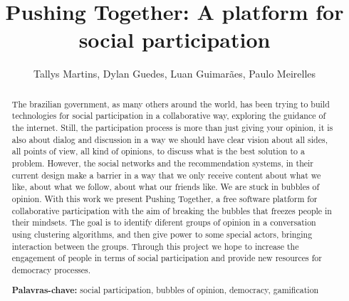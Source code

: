 \documentclass{llncs}
\begin{document}
\sloppy
\title{Pushing Together: A platform for social participation}

\author{Tallys Martins, Dylan Guedes,
        Luan Guimarães, Paulo Meirelles}


\maketitle
\begin{abstract}
  The brazilian government, as many others around the world, has been trying to
  build technologies for social participation in a collaborative way, exploring
  the guidance of the internet.
  Still, the participation process is more than just giving your opinion, it is
  also about dialog and discussion in a way we should have clear vision about all sides,
  all points of view, all kind of opinions, to discuss what is the best solution
  to a problem. However, the social networks and the recommendation systems, in their
  current design make a barrier in a way that we only receive content about
  what we like, about what we follow, about what our friends like. We are 
  stuck in bubbles of opinion.
  With this work we present Pushing Together, a free software platform
  for collaborative participation with the aim of breaking the bubbles that
  freezes people in their mindsets. The goal is to identify diferent groups of
  opinion in a conversation using clustering algorithms, and then give power to some
  special actors, bringing interaction between the groups.
  Through this project we hope to increase the engagement of people in terms of
  social participation and provide new resources for democracy processes.

\textbf{Palavras-chave:} social participation, bubbles of opinion, democracy, gamification
\end{abstract}
\end{document}
